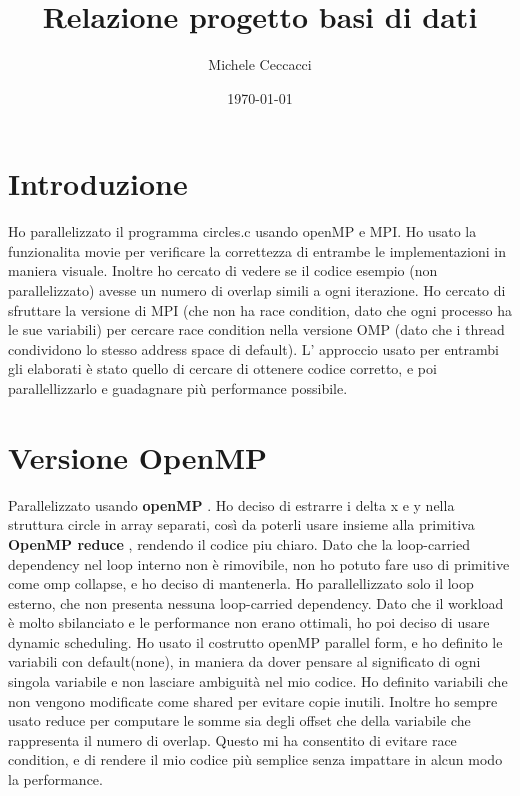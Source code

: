 \documentclass[a4paper,12pt, twoside]{report}
\begin{document}
\title{Relazione progetto basi di dati}
\author{Michele Ceccacci}
\date{\today}

\section*{Introduzione}
Ho parallelizzato il programma circles.c usando openMP e MPI. Ho usato la funzionalita movie per verificare la correttezza di entrambe le implementazioni in maniera visuale. Inoltre ho cercato di vedere se il codice esempio (non parallelizzato) avesse un numero di overlap simili a ogni iterazione. Ho cercato di sfruttare la versione di MPI (che non ha race condition, dato che ogni processo ha le sue variabili) per cercare race condition nella versione OMP (dato che i thread condividono lo stesso address space di default). 
L' approccio usato per entrambi gli elaborati è stato quello di cercare di ottenere codice corretto, e poi parallellizzarlo e guadagnare più performance possibile.
\section*{Versione OpenMP}
Parallelizzato usando \textbf{openMP} \cite{openMP}.
Ho deciso di estrarre i delta x e y nella struttura circle in array separati, così da poterli usare insieme alla primitiva \textbf{OpenMP reduce} \cite{omp_reduce}, rendendo il codice piu chiaro.
Dato che la loop-carried dependency nel loop interno non è rimovibile, non ho potuto fare uso di primitive come omp collapse, e ho deciso di mantenerla.
Ho parallellizzato solo il loop esterno, che non presenta nessuna loop-carried dependency.
Dato che il workload è molto sbilanciato e le performance non erano ottimali, ho poi deciso di usare dynamic scheduling.
Ho usato il costrutto openMP parallel form, e ho definito le variabili con default(none), in maniera da dover pensare al significato di ogni singola variabile e non lasciare ambiguità nel mio codice. Ho definito variabili che non vengono modificate come shared per evitare copie inutili.
Inoltre ho sempre usato  reduce per computare le somme sia degli offset che della variabile che rappresenta il numero di overlap.
Questo mi ha consentito di evitare race condition, e di rendere il mio codice più semplice senza impattare in alcun modo la performance.
\end{document}

